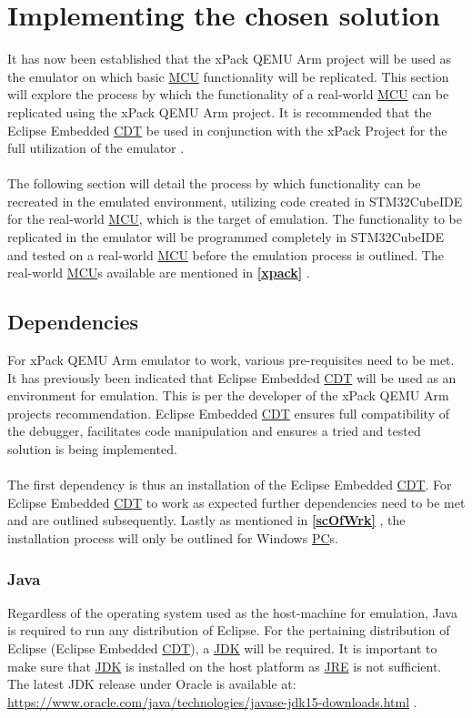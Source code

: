 \section{Implementing the chosen solution}
\label{CompSolu}
It has now been established that the xPack QEMU Arm project will be used as the emulator on which basic \hyperref[listAbr]{MCU} functionality will be replicated. This section will explore the process by which the functionality of a real-world \hyperref[listAbr]{MCU} can be replicated using the xPack QEMU Arm project. It is recommended that the Eclipse Embedded \hyperref[listAbr]{CDT} be used in conjunction with the xPack Project for the full utilization of the emulator \cite{emailIl}.
\\\\
The following section will detail the process by which functionality can be recreated in the emulated environment, utilizing code created in STM32CubeIDE for the real-world \hyperref[listAbr]{MCU}, which is the target of emulation. The functionality to be replicated in the emulator will be programmed completely in STM32CubeIDE and tested on a real-world \hyperref[listAbr]{MCU} before the emulation process is outlined. The real-world \hyperref[listAbr]{MCU}s available are mentioned in \textbf{\ref{xpack} }.

\subsection{Dependencies}
\label{dependencies}
For xPack QEMU Arm emulator to work, various pre-requisites need to be met. It has previously been  indicated that Eclipse Embedded \hyperref[listAbr]{CDT} will be used as an environment for emulation. This is per the developer of the xPack QEMU Arm projects recommendation. Eclipse Embedded \hyperref[listAbr]{CDT} ensures full compatibility of the debugger, facilitates code manipulation and ensures a tried and tested solution is being implemented.
\\\\
The first dependency is thus an installation of the Eclipse Embedded \hyperref[listAbr]{CDT}. For Eclipse Embedded \hyperref[listAbr]{CDT} to work as expected further dependencies need to be met and are outlined subsequently. Lastly as mentioned in \textbf{\ref{scOfWrk} }, the installation process will only be outlined for Windows \hyperref[listAbr]{PC}s.

\subsubsection{Java}
\label{Java}
Regardless of the operating system used as the host-machine for emulation, Java is required to run any distribution of Eclipse. For the pertaining distribution of Eclipse (Eclipse Embedded \hyperref[listAbr]{CDT}), a \hyperref[listAbr]{JDK} will be required. It is important to make sure that \hyperref[listAbr]{JDK} is installed on the host platform as \hyperref[listAbr]{JRE} is not sufficient. The latest JDK release under Oracle is available at: \color{blue}\url{https://www.oracle.com/java/technologies/javase-jdk15-downloads.html} \color{black} \cite{emailIl} \cite{eclipse}.


